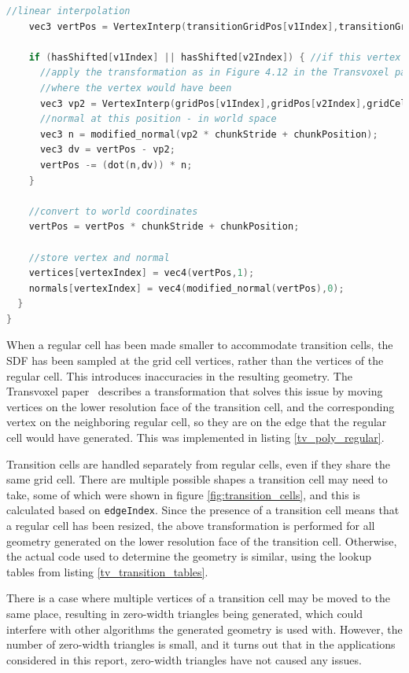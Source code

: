\documentclass[11pt]{article}
\begin{document}
\begin{enumerate}
\begin{lstlisting}[language=C++,label={tv_poly_regular},caption={Code for generating the geometry in a regular cell.}]
    //linear interpolation
    vec3 vertPos = VertexInterp(transitionGridPos[v1Index],transitionGridPos[v2Index],gridCells[v1Index],gridCells[v2Index]);

    if (hasShifted[v1Index] || hasShifted[v2Index]) { //if this vertex has moved
      //apply the transformation as in Figure 4.12 in the Transvoxel paper
      //where the vertex would have been
      vec3 vp2 = VertexInterp(gridPos[v1Index],gridPos[v2Index],gridCells[v1Index],gridCells[v2Index]);
      //normal at this position - in world space
      vec3 n = modified_normal(vp2 * chunkStride + chunkPosition);
      vec3 dv = vertPos - vp2;
      vertPos -= (dot(n,dv)) * n;
    }

    //convert to world coordinates
    vertPos = vertPos * chunkStride + chunkPosition;

    //store vertex and normal
    vertices[vertexIndex] = vec4(vertPos,1);
    normals[vertexIndex] = vec4(modified_normal(vertPos),0);
  }
}
\end{lstlisting}
When a regular cell has been made smaller to accommodate transition cells, the SDF has been sampled at the grid cell vertices, rather than the vertices of the regular cell. This introduces inaccuracies in the resulting geometry. The Transvoxel paper~\cite{lengyel_2010} describes a transformation that solves this issue by moving vertices on the lower resolution face of the transition cell, and the corresponding vertex on the neighboring regular cell, so they are on the edge that the regular cell would have generated. This was implemented in listing \ref{tv_poly_regular}.

Transition cells are handled separately from regular cells, even if they share the same grid cell. There are multiple possible shapes a transition cell may need to take, some of which were shown in figure \ref{fig:transition_cells}, and this is calculated based on \texttt{edgeIndex}. Since the presence of a transition cell means that a regular cell has been resized, the above transformation is performed for all geometry generated on the lower resolution face of the transition cell. Otherwise, the actual code used to determine the geometry is similar, using the lookup tables from listing \ref{tv_transition_tables}.

There is a case where multiple vertices of a transition cell may be moved to the same place, resulting in zero-width triangles being generated, which could interfere with other algorithms the generated geometry is used with. However, the number of zero-width triangles is small, and it turns out that in the applications considered in this report, zero-width triangles have not caused any issues.


\end{enumerate}
\end{document}
